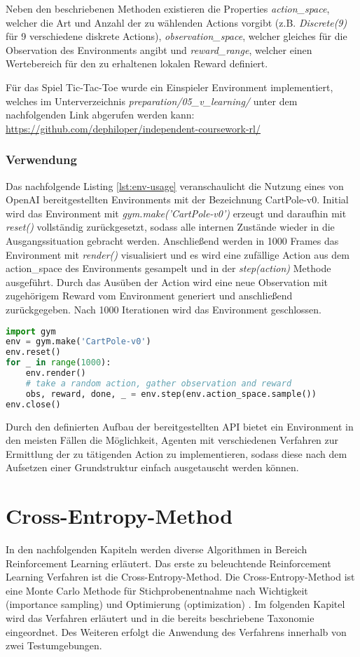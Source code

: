 \documentclass[11pt]{scrartcl}
\begin{document}
Neben den beschriebenen Methoden existieren die Properties \textit{action\_space}, welcher die
Art und Anzahl der zu wählenden Actions vorgibt (z.B. \textit{Discrete(9)} für 9 verschiedene
diskrete Actions), \textit{observation\_space}, welcher gleiches für die Observation des
Environments angibt und \textit{reward\_range}, welcher einen Wertebereich für den zu erhaltenen
lokalen Reward definiert.

Für das Spiel Tic-Tac-Toe wurde ein Einspieler Environment implementiert, welches im
Unterverzeichnis \textit{preparation/05\_v\_learning/} unter dem nachfolgenden Link abgerufen
werden kann: \url{https://github.com/dephiloper/independent-coursework-rl/}


\subsubsection{Verwendung}
Das nachfolgende Listing \autoref{lst:env-usage} veranschaulicht die Nutzung eines von OpenAI
bereitgestellten Environments mit der Bezeichnung CartPole-v0. Initial wird das Environment
mit \textit{gym.make('CartPole-v0')} erzeugt und daraufhin mit \textit{reset()} vollständig
zurückgesetzt, sodass alle internen Zustände wieder in die Ausgangssituation gebracht werden. 
Anschließend werden in 1000 Frames das Environment mit \textit{render()} visualisiert und es
wird eine zufällige Action aus dem action\_space des Environments gesampelt und in der
\textit{step(action)} Methode ausgeführt. Durch das Ausüben der Action wird eine neue
Observation mit zugehörigem Reward vom Environment generiert und anschließend zurückgegeben.
Nach 1000 Iterationen wird das Environment geschlossen. 
\begin{lstlisting}[language=Python, caption=environment usage, label=lst:env-usage]
import gym
env = gym.make('CartPole-v0')
env.reset()
for _ in range(1000):
    env.render()
    # take a random action, gather observation and reward
    obs, reward, done, _ = env.step(env.action_space.sample())
env.close()
\end{lstlisting}

Durch den definierten Aufbau der bereitgestellten API bietet ein Environment in den meisten Fällen
die Möglichkeit, Agenten mit verschiedenen Verfahren zur Ermittlung der zu tätigenden Action zu
implementieren, sodass diese nach dem Aufsetzen einer Grundstruktur einfach ausgetauscht werden
können.


\newpage
\section{Cross-Entropy-Method}
\label{sec:cross-entropy-method}
In den nachfolgenden Kapiteln werden diverse Algorithmen in Bereich Reinforcement Learning
erläutert. Das erste zu beleuchtende Reinforcement Learning Verfahren ist die
Cross-Entropy-Method. Die Cross-Entropy-Method ist eine Monte Carlo Methode für
Stichprobenentnahme nach Wichtigkeit (importance sampling) und Optimierung (optimization)
\cite[~S.29 ff.]{R2004}. Im folgenden Kapitel wird das Verfahren erläutert und in die bereits
beschriebene Taxonomie eingeordnet. Des Weiteren erfolgt die Anwendung des Verfahrens innerhalb
von zwei Testumgebungen. 
\end{document}
